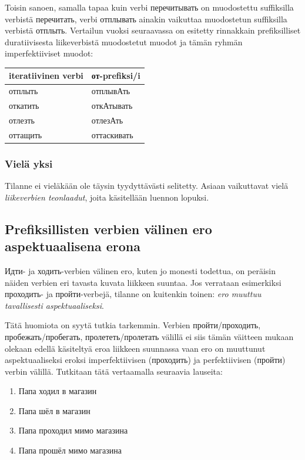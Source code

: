 \documentclass[]{scrartcl}
\providecommand{\tightlist}{%
  \setlength{\itemsep}{0pt}\setlength{\parskip}{0pt}}
\begin{document}
Toisin sanoen, samalla tapaa kuin verbi перечитывать on muodostettu
suffiksilla verbistä перечитать, verbi отплывать ainakin vaikuttaa
muodostetun suffiksilla verbistä отплыть. Vertailun vuoksi seuraavassa
on esitetty rinnakkain prefiksilliset duratiivisesta liikeverbistä
muodostetut muodot ja tämän ryhmän imperfektiiviset muodot:

\begin{longtable}[c]{@{}ll@{}}
\toprule
iteratiivinen verbi & от-prefiksi/i\tabularnewline
\midrule
\endhead
отплыть & отплывАть\tabularnewline
откатить & откАтывать\tabularnewline
отлезть & отлезАть\tabularnewline
оттащить & оттаскивать\tabularnewline
\bottomrule
\end{longtable}

\subsubsection{Vielä yksi}\label{vieluxe4-yksi}

Tilanne ei vieläkään ole täysin tyydyttävästi selitetty. Asiaan
vaikuttavat vielä \emph{liikeverbien teonlaadut}, joita käsitellään
luennon lopuksi.

\subsection{Prefiksillisten verbien välinen ero aspektuaalisena
erona}\label{prefiksillisten-verbien-vuxe4linen-ero-aspektuaalisena-erona}

Идти- ja ходить-verbien välinen ero, kuten jo monesti todettua, on
peräisin näiden verbien eri tavasta kuvata liikkeen suuntaa. Jos
verrataan esimerkiksi проходить- ja пройти-verbejä, tilanne on kuitenkin
toinen: \emph{ero muuttuu tavallisesti aspektuaaliseksi}.

Tätä huomiota on syytä tutkia tarkemmin. Verbien пройти/проходить,
пробежать/пробегать, пролететь/пролетать välillä ei siis tämän väitteen
mukaan olekaan edellä käsiteltyä eroa liikkeen suunnassa vaan ero on
muuttunut aspektuaaliseksi eroksi imperfektiivisen (проходить) ja
perfektiivisen (пройти) verbin välillä. Tutkitaan tätä vertaamalla
seuraavia lauseita:

\begin{enumerate}
\def\labelenumi{(\arabic{enumi})}
\setcounter{enumi}{409}
\tightlist
\item
  Папа ходил в магазин
\item
  Папа шёл в магазин
\item
  Папа проходил мимо магазина
\item
  Папа прошёл мимо магазина
\end{enumerate}
\end{document}

